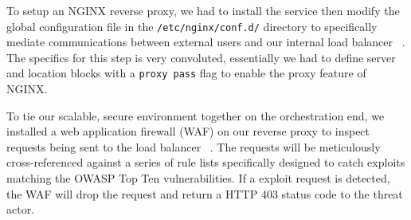 To setup an NGINX reverse proxy, we had to install the service then modify the global configuration file in the \texttt{/etc/nginx/conf.d/} directory to specifically mediate communications between external users and our internal load balancer ~\cite{hostinger_nginx_proxy}. The specifics for this step is
very convoluted, essentially we had to define server and location blocks with a \texttt{proxy pass} flag to enable the proxy feature of NGINX.

To tie our scalable, secure environment together on the orchestration end, we installed a web application firewall (WAF) on our reverse proxy to inspect requests being sent to the load balancer ~\cite{linode_modsecurity}. The requests
will be meticulously cross-referenced against a series of rule lists specifically designed to catch exploits matching the OWASP Top Ten vulnerabilities. If a exploit request is detected, the WAF will drop the request and return
a HTTP 403 status code to the threat actor.
